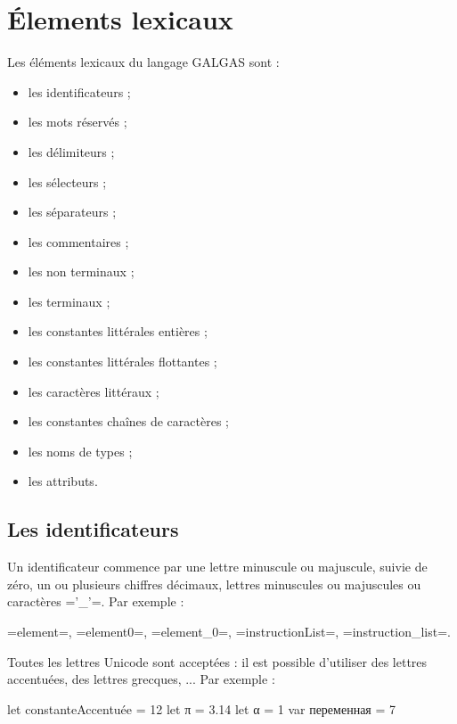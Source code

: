 
\chapter{Élements lexicaux}

Les éléments lexicaux du langage GALGAS sont :
\begin{itemize}
  \item les identificateurs ;
  \item les mots réservés ;
  \item les délimiteurs ;
  \item les sélecteurs ;
  \item les séparateurs ;
  \item les commentaires ;
  \item les non terminaux ;
  \item les terminaux ;
  \item les constantes littérales entières ;
  \item les constantes littérales flottantes ;
  \item les caractères littéraux  ;
  \item les constantes chaînes de caractères ;
  \item les noms de types ;
  \item les attributs.
\end{itemize}


\section{Les identificateurs}

Un identificateur commence par une lettre minuscule ou majuscule, suivie de zéro, un ou plusieurs chiffres décimaux, lettres minuscules ou majuscules ou caractères \ggs='_'=. Par exemple :

\ggs=element=, \ggs=element0=, \ggs=element_0=, \ggs=instructionList=, \ggs=instruction_list=.

Toutes les lettres Unicode sont acceptées : il est possible d'utiliser des lettres accentuées, des lettres grecques, ... Par exemple :

\begin{galgas}
let constanteAccentuée = 12
let π = 3.14
let α = 1
var переменная = 7
\end{galgas}


